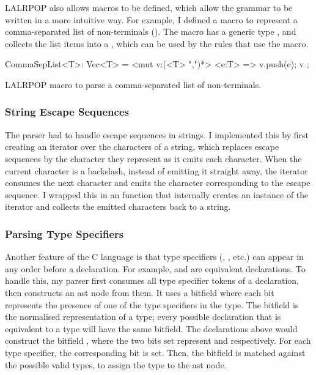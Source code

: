 \documentclass[00-main.tex]{subfiles}
\begin{document}
LALRPOP also allows macros to be defined, which allow the grammar to be written in a more intuitive way.
For example, I defined a macro to represent a comma-separated list of non-terminals ().
The macro has a generic type , and collects the list items into a , which can be used by the rules that use the macro.

\begin{listing}[t]
  \begin{RustListing}
    CommaSepList<T>: Vec<T> = {
        <mut v:(<T> ",")*> <e:T> => {
            v.push(e);
            v
        }
    };
  \end{RustListing}
  \caption{LALRPOP macro to parse a comma-separated list of non-terminals.}
  \label{lst:parser macro for comma-separated list}
\end{listing}

\subsubsection{String Escape Sequences}

The parser had to handle escape sequences in strings.
I implemented this by first creating an iterator over the characters of a string, which replaces escape sequences by the character they represent as it emits each character.
When the current character is a backslash, instead of emitting it straight away, the iterator consumes the next character and emits the character corresponding to the escape sequence.
I wrapped this in an  function that internally creates an instance of the iterator and collects the emitted characters back to a string.

\subsubsection{Parsing Type Specifiers}

Another feature of the C language is that type specifiers (, , etc.) can appear in any order before a declaration.
For example,  and  are equivalent declarations.
To handle this, my parser first consumes all type specifier tokens of a declaration, then constructs an  \gls{ast} node from them.
It uses a bitfield where each bit represents the presence of one of the type specifiers in the type.
The bitfield is the normalised representation of a type; every possible declaration that is equivalent to a type will have the same bitfield.
The declarations above would construct the bitfield , where the two bits set represent  and  respectively.
For each type specifier, the corresponding bit is set.
Then, the bitfield is matched against the possible valid types, to assign the type to the \gls{ast} node.
\end{document}
